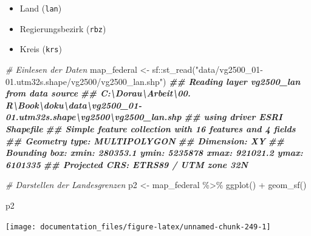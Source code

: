 \documentclass[
]{article}
\newenvironment{Shaded}{\begin{snugshade}}{\end{snugshade}}
\newcommand{\CommentTok}[1]{\textcolor[rgb]{0.56,0.35,0.01}{\textit{#1}}}
\newcommand{\DocumentationTok}[1]{\textcolor[rgb]{0.56,0.35,0.01}{\textbf{\textit{#1}}}}
\newcommand{\FunctionTok}[1]{\textcolor[rgb]{0.00,0.00,0.00}{#1}}
\newcommand{\NormalTok}[1]{#1}
\newcommand{\OtherTok}[1]{\textcolor[rgb]{0.56,0.35,0.01}{#1}}
\newcommand{\SpecialCharTok}[1]{\textcolor[rgb]{0.00,0.00,0.00}{#1}}
\newcommand{\StringTok}[1]{\textcolor[rgb]{0.31,0.60,0.02}{#1}}
\providecommand{\tightlist}{%
  \setlength{\itemsep}{0pt}\setlength{\parskip}{0pt}}
\begin{document}
\begin{itemize}
\tightlist
\item
  Land (\texttt{lan})
\item
  Regierungsbezirk (\texttt{rbz})
\item
  Kreis (\texttt{krs})
\end{itemize}

\begin{Shaded}
\begin{Highlighting}[]

\CommentTok{\# Einlesen der Daten}
\NormalTok{map\_federal }\OtherTok{\textless{}{-}}\NormalTok{ sf}\SpecialCharTok{::}\FunctionTok{st\_read}\NormalTok{(}\StringTok{"data/vg2500\_01{-}01.utm32s.shape/vg2500/vg2500\_lan.shp"}\NormalTok{)}
\DocumentationTok{\#\# Reading layer \textasciigrave{}vg2500\_lan\textquotesingle{} from data source }
\DocumentationTok{\#\#   \textasciigrave{}C:\textbackslash{}Dorau\textbackslash{}Arbeit\textbackslash{}00. R\textbackslash{}Book\textbackslash{}doku\textbackslash{}data\textbackslash{}vg2500\_01{-}01.utm32s.shape\textbackslash{}vg2500\textbackslash{}vg2500\_lan.shp\textquotesingle{} }
\DocumentationTok{\#\#   using driver \textasciigrave{}ESRI Shapefile\textquotesingle{}}
\DocumentationTok{\#\# Simple feature collection with 16 features and 4 fields}
\DocumentationTok{\#\# Geometry type: MULTIPOLYGON}
\DocumentationTok{\#\# Dimension:     XY}
\DocumentationTok{\#\# Bounding box:  xmin: 280353.1 ymin: 5235878 xmax: 921021.2 ymax: 6101335}
\DocumentationTok{\#\# Projected CRS: ETRS89 / UTM zone 32N}

\CommentTok{\# Darstellen der Landesgrenzen}
\NormalTok{p2 }\OtherTok{\textless{}{-}}\NormalTok{ map\_federal }\SpecialCharTok{\%\textgreater{}\%}
  \FunctionTok{ggplot}\NormalTok{() }\SpecialCharTok{+} 
  \FunctionTok{geom\_sf}\NormalTok{()}

\NormalTok{p2}
\end{Highlighting}
\end{Shaded}

\begin{center}\texttt{[image: documentation\_files/figure-latex/unnamed-chunk-249-1]} \end{center}
\end{document}
